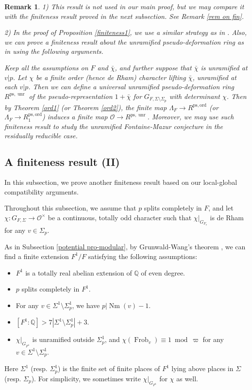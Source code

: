 \documentclass[a4paper, 12pt]{amsart}
\newtheorem{rem}[thm]{\bf Remark}
\def\ps{\mathrm{ps}}
\def\ord{\mathrm{ord}}
\newcommand{\cO}{\mathcal{O}}
\begin{document}
    \begin{rem}
    	1) This result is not used in our main proof, but we may compare it with the finiteness result proved in the next subsection. See Remark \ref{rem on fin}.
    	
    	2) In the proof of Proposition \ref{finiteness1}, we use a similar strategy as in \cite{Allen_2014}. Also, we can prove a finiteness result about the unramified pseudo-deformation ring as in \cite[Theorem 1]{Allen_2014} using the following arguments.
    	
    	Keep all the assumptions on $F$ and $\bar{\chi}$, and further suppose that $\bar{\chi}$ is unramified at $v|p$. Let $\chi$ be a finite order (hence de Rham) character lifting $\bar{\chi}$, unramified at each $v|p$. Then we can define a universal unramified pseudo-deformation ring $R^{\ps, \operatorname{unr}}$ of the pseudo-representation $1+\bar{\chi}$ for $G_{F, \Sigma\setminus\Sigma_p}$ with determinant $\chi$. Then by Theorem \ref{ord1} (or Theorem \ref{ord2}), the finite map $\Lambda_F \to R^{\ps, \ord}$ (or $\Lambda_F \to R_1^{\ps, \ord}$) induces a finite map $\cO \to R^{\ps, \operatorname{unr}}$. Moreover, we may use such finiteness result to study the unramified Fontaine-Mazur conjecture in the residually reducible case.
    \end{rem}
    
    
    \subsection{A finiteness result (II)}\label{sec finite 2}
    In this subsection, we prove another finiteness result based on our local-global compatibility arguments.
    
    Throughout this subsection, we assume that $p$ splits completely in $F$, and let  $\chi: G_{F, \Sigma} \to \cO^\times$ be a continuous, totally odd character such that $\chi|_{G_{F_v}}$ is de Rham for any $v \in \Sigma_p$. 
    
    As in Subsection \ref{potential pro-modular}, by Grunwald-Wang's theorem \cite[Theorem 5, page 80]{artin}, we can find a finite extension $F^1/F$ satisfying the following assumptions:
    \begin{itemize}
    	\item $F^1$ is a totally real abelian extension of $\mathbb{Q}$ of even degree.
    	\item $p$ splits completely in $F^1$.
    	\item  For any $v \in \Sigma^1 \setminus \Sigma^1_p$, we have $p| \operatorname{Nm}(v)-1$.
    	\item $[F^1:\mathbb{Q}]>7|\Sigma^1 \setminus \Sigma^1_p|+3$.
    	\item  $\chi|_{G_{F^1}}$ is unramified outside $ \Sigma^1_p$, and $\chi(\operatorname{Frob}_v) \equiv 1~\operatorname{mod}~\varpi$ for any $v \in \Sigma^1 \setminus \Sigma^1_p$.
    \end{itemize}
    Here $ \Sigma^1$ (resp. $\Sigma^1_p $) is the finite set of finite places of $F^1$ lying above places in $\Sigma$ (resp. $\Sigma_p $). For simplicity, we sometimes write $\chi|_{G_{F^1}}$ for $\chi$ as well.
    
\end{document}
